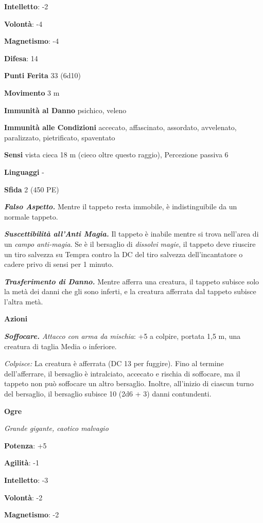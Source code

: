\begin{multicols}{2}
\textbf{Intelletto}: -2

\textbf{Volontà}: -4

\textbf{Magnetismo}: -4

\textbf{Difesa}: 14

\textbf{Punti Ferita} 33 (6d10)

\textbf{Movimento} 3 m

\textbf{Immunità al Danno} psichico, veleno

\textbf{Immunità alle Condizioni} accecato, affascinato, assordato,
avvelenato, paralizzato, pietrificato, spaventato

\textbf{Sensi} vista cieca 18 m (cieco oltre questo raggio), Percezione
passiva 6

\textbf{Linguaggi} -

\textbf{Sfida} 2 (450 PE)

\emph{\textbf{Falso Aspetto.}} Mentre il tappeto resta immobile, è
indistinguibile da un normale tappeto.

\emph{\textbf{Suscettibilità all'Anti Magia.}} Il tappeto è inabile
mentre si trova nell'area di un \emph{campo anti-magia}. Se è il
bersaglio di \emph{dissolvi} \emph{magie}, il tappeto deve riuscire un
tiro salvezza su Tempra contro la DC del tiro salvezza
dell'incantatore o cadere privo di sensi per 1 minuto.

\emph{\textbf{Trasferimento di Danno.}} Mentre afferra una creatura, il
tappeto subisce solo la metà dei danni che gli sono inferti, e la
creatura afferrata dal tappeto subisce l'altra metà.

\textbf{Azioni}

\emph{\textbf{Soffocare.} Attacco con arma da mischia}: +5 a colpire,
portata 1,5 m, una creatura di taglia Media o inferiore.

\emph{Colpisce:} La creatura è afferrata (DC 13 per fuggire). Fino al
termine dell'afferrare, il bersaglio è intralciato, accecato e rischia
di soffocare, ma il tappeto non può soffocare un altro bersaglio.
Inoltre, all'inizio di ciascun turno del bersaglio, il bersaglio subisce
10 (2d6 + 3) danni contundenti.

\textbf{Ogre}

\emph{Grande gigante, caotico malvagio}

\textbf{Potenza}: +5

\textbf{Agilità}: -1

\textbf{Intelletto}: -3

\textbf{Volontà}: -2

\textbf{Magnetismo}: -2


\end{multicols}
